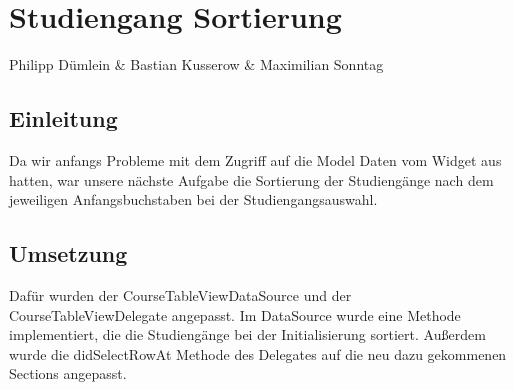 \chapter{Studiengang Sortierung}
Philipp Dümlein \& Bastian Kusserow \& Maximilian Sonntag

\section{Einleitung}
Da wir anfangs Probleme mit dem Zugriff auf die Model Daten vom Widget aus hatten, war unsere nächste Aufgabe die Sortierung der Studiengänge nach dem jeweiligen Anfangsbuchstaben bei der Studiengangsauswahl.

\section{Umsetzung}
Dafür wurden der CourseTableViewDataSource und der CourseTableViewDelegate angepasst. Im DataSource wurde eine Methode implementiert, die die Studiengänge bei der Initialisierung sortiert. Außerdem wurde die didSelectRowAt Methode des Delegates auf die neu dazu gekommenen Sections angepasst.

